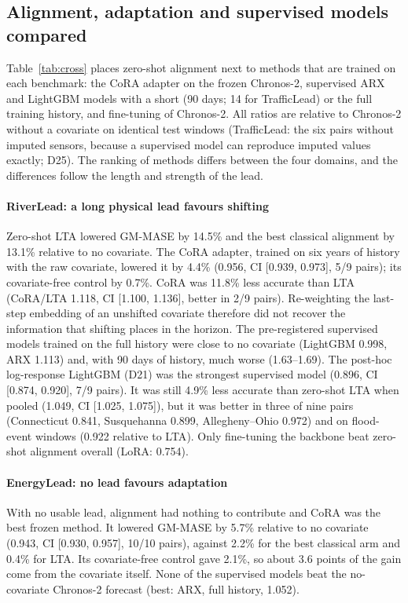\documentclass[preprint,11pt,authoryear]{elsarticle}
\newcommand{\lta}{\textsc{LTA}}
\begin{document}
\subsection{Alignment, adaptation and supervised models compared}
\label{sec:cross}

Table~\ref{tab:cross} places zero-shot alignment next to methods that are trained on each benchmark: the CoRA adapter on the frozen Chronos-2, supervised ARX and LightGBM models with a short (90 days; 14 for TrafficLead) or the full training history, and fine-tuning of Chronos-2. All ratios are relative to Chronos-2 without a covariate on identical test windows (TrafficLead: the six pairs without imputed sensors, because a supervised model can reproduce imputed values exactly; D25). The ranking of methods differs between the four domains, and the differences follow the length and strength of the lead.

\paragraph{RiverLead: a long physical lead favours shifting} Zero-shot \lta{} lowered GM-MASE by 14.5\% and the best classical alignment by 13.1\% relative to no covariate. The CoRA adapter, trained on six years of history with the raw covariate, lowered it by 4.4\% (0.956, CI [0.939, 0.973], 5/9 pairs); its covariate-free control by 0.7\%. CoRA was 11.8\% less accurate than \lta{} (CoRA/\lta{} 1.118, CI [1.100, 1.136], better in 2/9 pairs). Re-weighting the last-step embedding of an unshifted covariate therefore did not recover the information that shifting places in the horizon. The pre-registered supervised models trained on the full history were close to no covariate (LightGBM 0.998, ARX 1.113) and, with 90 days of history, much worse (1.63--1.69). The post-hoc log-response LightGBM (D21) was the strongest supervised model (0.896, CI [0.874, 0.920], 7/9 pairs). It was still 4.9\% less accurate than zero-shot \lta{} when pooled (1.049, CI [1.025, 1.075]), but it was better in three of nine pairs (Connecticut 0.841, Susquehanna 0.899, Allegheny--Ohio 0.972) and on flood-event windows (0.922 relative to \lta{}). Only fine-tuning the backbone beat zero-shot alignment overall (LoRA: 0.754).

\paragraph{EnergyLead: no lead favours adaptation} With no usable lead, alignment had nothing to contribute and CoRA was the best frozen method. It lowered GM-MASE by 5.7\% relative to no covariate (0.943, CI [0.930, 0.957], 10/10 pairs), against 2.2\% for the best classical arm and 0.4\% for \lta{}. Its covariate-free control gave 2.1\%, so about 3.6 points of the gain come from the covariate itself. None of the supervised models beat the no-covariate Chronos-2 forecast (best: ARX, full history, 1.052).
\end{document}
